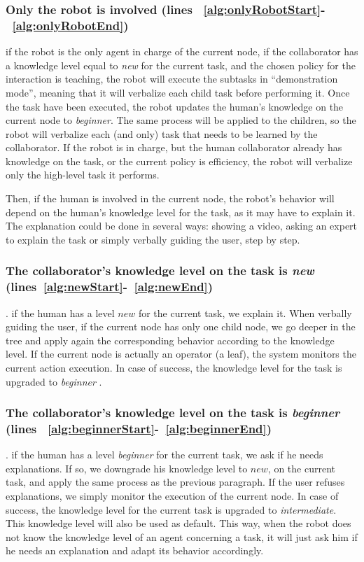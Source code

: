 \subsubsection{Only the robot is involved (lines ~\ref{alg:onlyRobotStart}-~\ref{alg:onlyRobotEnd})} if the robot is the only agent in charge of the current node, if the collaborator has a knowledge level equal to \textit{new} for the current task, and the chosen policy for the interaction is teaching, the robot will execute the subtasks in ``demonstration mode'', meaning that it will verbalize each child task before performing it. Once the task have been executed, the robot updates the human's knowledge on the current node to \textit{beginner}. The same process will be applied to the children, so the robot will verbalize each (and only) task that needs to be learned by the collaborator.
If the robot is in charge, but the human collaborator already has knowledge on the task, or the current policy is efficiency, the robot will verbalize only the high-level task it performs.

Then, if the human is involved in the current node, the robot's behavior will depend on the human's knowledge level for the task, as it may have to explain it.
The explanation could be done in several ways: showing a video, asking an expert to explain the task or simply verbally guiding the user, step by step. 

\subsubsection{The collaborator's knowledge level on the task is \textit{new} (lines~\ref{alg:newStart}-~\ref{alg:newEnd})}. if the human has a level $new$ for the current task, we explain it.
When verbally guiding the user, if the current node has only one child node, we  go deeper in the tree and apply again the corresponding behavior according to the knowledge level. If the current node is actually an operator (a leaf), the system monitors the current action execution. In case of success, the knowledge level for the task is upgraded to \textit{beginner} .

\subsubsection{The collaborator's knowledge level on the task is \textit{beginner} (lines ~\ref{alg:beginnerStart}-~\ref{alg:beginnerEnd})}. if the human has a level \textit{beginner} for the current task, we ask if he needs explanations. If so, we downgrade his knowledge level to $new$, on the current task, and apply the same process as the previous paragraph. If the user refuses explanations, we simply monitor the execution of the current node. In case of success, the knowledge level for the current task is upgraded to \textit{intermediate}. This knowledge level will also be used as default. This way, when the robot does not know the knowledge level of an agent concerning a task, it will just ask him if he needs an explanation and adapt its behavior accordingly.


